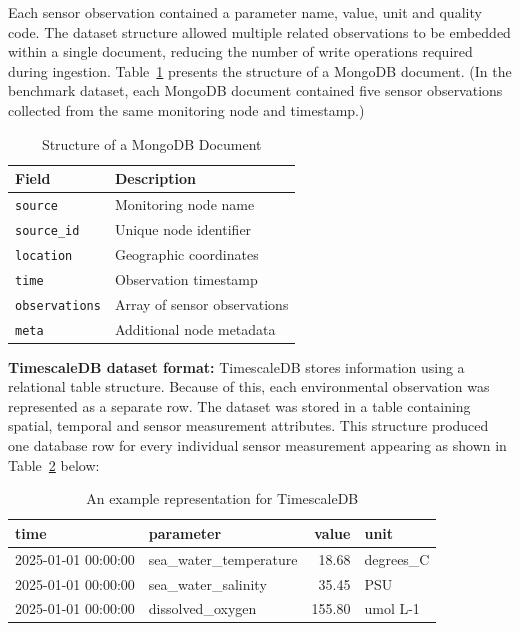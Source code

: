 Each sensor observation contained a parameter name, value, unit and quality code. The dataset structure allowed multiple related observations to be embedded within a single document, reducing the number of write operations required during ingestion. Table~\ref{tab:mongodb-document-structure}  presents the structure of a MongoDB document. (In the benchmark dataset, each MongoDB document contained five sensor observations collected from the same monitoring node and timestamp.)

\begin{table}[h]
\centering
\begin{tabular}{|l|p{8cm}|}
\hline
\textbf{Field} & \textbf{Description} \\
\hline
\texttt{source} & Monitoring node name \\
\hline
\texttt{source\_id} & Unique node identifier \\
\hline
\texttt{location} & Geographic coordinates \\
\hline
\texttt{time} & Observation timestamp \\
\hline
\texttt{observations} & Array of sensor observations \\
\hline
\texttt{meta} & Additional node metadata \\
\hline
\end{tabular}
\caption{Structure of a MongoDB Document}
\label{tab:mongodb-document-structure}
\end{table}



\textbf{TimescaleDB dataset format:}
TimescaleDB stores information using a relational table structure. Because of this, each environmental observation was represented as a separate row. The dataset was stored in a table containing spatial, temporal and sensor measurement attributes. This structure produced one database row for every individual sensor measurement appearing as shown in Table~\ref{tab:timescaledb-format} below:

\begin{table}[h]
\centering
\begin{tabular}{|l|l|r|l|}
\hline
\textbf{time} & \textbf{parameter} & \textbf{value} & \textbf{unit} \\
\hline
2025-01-01 00:00:00 & sea\_water\_temperature & 18.68  & degrees\_C \\
\hline
2025-01-01 00:00:00 & sea\_water\_salinity    & 35.45  & PSU \\
\hline
2025-01-01 00:00:00 & dissolved\_oxygen       & 155.80 & umol L-1 \\
\hline
\end{tabular}
\caption{An example representation for TimescaleDB}
\label{tab:timescaledb-format}
\end{table}



